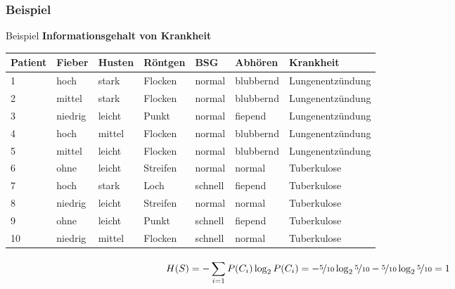 \subsubsection{Beispiel}



\begin{frame}{Beispiel}
\textbf{Informationsgehalt von Krankheit}\\[1em]

\begin{tabular}{|l l l l l l | l |}\hline
\textbf{Patient} & \textbf{\textcolor{ohmred}{Fieber}} & \textbf{\textcolor{ohmred}{Husten}} & \textbf{\textcolor{ohmred}{Röntgen}} & \textbf{\textcolor{ohmred}{BSG}} & \textbf{\textcolor{ohmred}{Abhören}} &\textbf{\textcolor{ohmgreen}{Krankheit}}\\ \hline
1 & hoch & stark & Flocken & normal & blubbernd & Lungenentzündung \\
2 & mittel & stark & Flocken & normal & blubbernd & Lungenentzündung \\
3 & niedrig & leicht & Punkt & normal & fiepend & Lungenentzündung \\
4 & hoch & mittel & Flocken & normal & blubbernd & Lungenentzündung \\
5 & mittel & leicht & Flocken & normal & blubbernd & Lungenentzündung \\
6 & ohne & leicht & Streifen & normal & normal & Tuberkulose \\
7 & hoch & stark & Loch & schnell & fiepend & Tuberkulose \\
8 & niedrig & leicht & Streifen & normal & normal & Tuberkulose \\
9 & ohne & leicht & Punkt & schnell & fiepend & Tuberkulose \\
10 & niedrig & mittel & Flocken & schnell & normal & Tuberkulose \\ \hline 
\end{tabular}

\vfill

\pause 

\[H(S) = - \sum_{i=1}^{} P(C_i) \log_2 P(C_i) = - \nicefrac{5}{10} \log_2 \nicefrac{5}{10} - \nicefrac{5}{10} \log_2 \nicefrac{5}{10} = 1\]

\end{frame}




